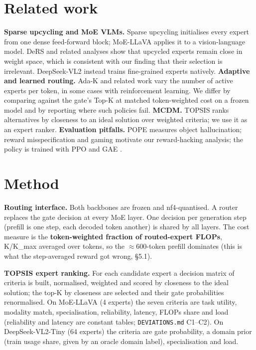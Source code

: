 \section{Related work}\label{related-work}

\textbf{Sparse upcycling and MoE VLMs.} Sparse upcycling \citep{komatsuzaki2023upcycling} initialises every expert from one dense feed-forward block; MoE-LLaVA \citep{lin2024moellava} applies it to a vision-language model. DeRS \citep{huang2025ders} and related analyses show that upcycled experts remain close in weight space, which is consistent with our finding that their selection is irrelevant. DeepSeek-VL2 \citep{wu2024deepseekvl2} instead trains fine-grained experts natively.
\textbf{Adaptive and learned routing.} Ada-K \citep{yue2025adak} and related work vary the number of active experts per token, in some cases with reinforcement learning. We differ by comparing against the gate's Top-K at matched token-weighted cost on a frozen model and by reporting where such policies fail.
\textbf{MCDM.} TOPSIS \citep{hwang1981madm} ranks alternatives by closeness to an ideal solution over weighted criteria; we use it as an expert ranker.
\textbf{Evaluation pitfalls.} POPE \citep{li2023pope} measures object hallucination; reward misspecification and gaming \citep{skalse2022reward, amodei2016concrete} motivate our reward-hacking analysis; the policy is trained with PPO and GAE \citep{schulman2017ppo, schulman2016gae}.

\section{Method}\label{method}

\textbf{Routing interface.} Both backbones are frozen and nf4-quantised. A router replaces the gate decision at every MoE layer. One decision per generation step (prefill is one step, each decoded token another) is shared by all layers. The cost measure is the \textbf{token-weighted fraction of routed-expert FLOPs}, K/K\_max averaged over tokens, so the $\approx$600-token prefill dominates (this is what the step-averaged reward got wrong, §5.1).

\textbf{TOPSIS expert ranking.} For each candidate expert a decision matrix of criteria is built, normalised, weighted and scored by closeness to the ideal solution; the top-K by closeness are selected and their gate probabilities renormalised. On MoE-LLaVA (4 experts) the seven criteria are task utility, modality match, specialisation, reliability, latency, FLOPs share and load (reliability and latency are constant tables; \texttt{DEVIATIONS.md} C1--C2). On DeepSeek-VL2-Tiny (64 experts) the criteria are gate probability, a domain prior (train usage share, given by an oracle domain label), specialisation and load.

